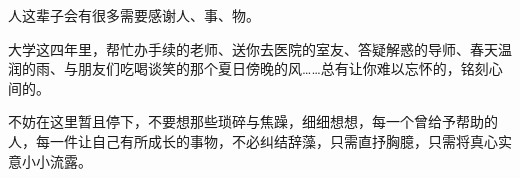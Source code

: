 \acknowledgement
人这辈子会有很多需要感谢人、事、物。

大学这四年里，帮忙办手续的老师、送你去医院的室友、答疑解惑的导师、春天温润的雨、与朋友们吃喝谈笑的那个夏日傍晚的风……总有让你难以忘怀的，铭刻心间的。

不妨在这里暂且停下，不要想那些琐碎与焦躁，细细想想，每一个曾给予帮助的人，每一件让自己有所成长的事物，不必纠结辞藻，只需直抒胸臆，只需将真心实意小小流露。
















